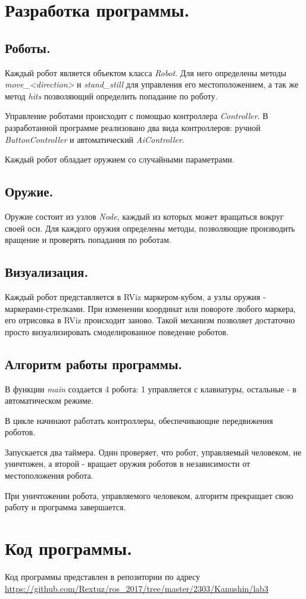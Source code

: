 \documentclass[14pt, a4paper]{extarticle}
\begin{document}
	\section{Разработка программы.}
	\subsection{Роботы.}
	Каждый робот является объектом класса \textit{Robot}. Для него определены методы \textit{move\_<direction>} и \textit{stand\_still} для управления его местоположением, а так же метод \textit{hits} позволяющий определить попадание по роботу.
	
	Управление роботами происходит с помощью контроллера \textit{Controller}. В разработанной программе реализовано два вида контроллеров: ручной \\ \textit{ButtonController} и автоматический \textit{AiController}.
	
	Каждый робот обладает оружием со случайными параметрами.
	
	\subsection{Оружие.}
	Оружие состоит из узлов \textit{Node}, каждый из которых может вращаться вокруг своей оси. Для каждого оружия определены методы, позволяющие производить вращение и проверять попадания по роботам.
	
	\subsection{Визуализация.}
	Каждый робот представляется в RViz маркером-кубом, а узлы оружия - маркерами-стрелками. При изменении координат или повороте любого маркера, его отрисовка в RViz происходит заново. Такой механизм позволяет достаточно просто визуализировать смоделированное поведение роботов.
	
	\subsection{Алгоритм работы программы.}
	В функции \textit{main} создается 4 робота: 1 управляется с клавиатуры, остальные - в автоматическом режиме.
	
	В цикле начинают работать контроллеры, обеспечивающие передвижения роботов.
	
	Запускается два таймера. Один проверяет, что робот, управляемый человеком, не уничтожен, а второй - вращает оружия роботов в независимости от местоположения робота.
	
	При уничтожении робота, управляемого человеком, алгоритм прекращает свою работу и программа завершается.

	\section{Код программы.}
	Код программы представлен в репозитории по адресу \url{https://github.com/Rextuz/ros_2017/tree/master/2303/Kanushin/lab3}
	
\end{document}

